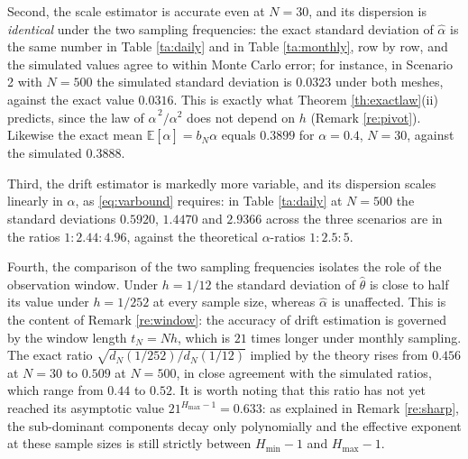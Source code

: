 \documentclass[11pt,reqno]{amsart}
\numberwithin{equation}{section}
\theoremstyle{plain}
\theoremstyle{definition}
\theoremstyle{remark}
\newcommand{\Hmax}{H_{\max}}
\newcommand{\Hmin}{H_{\min}}
\newcommand{\E}{\mathbb{E}}
\begin{document}
Second, the scale estimator is accurate even at $N=30$, and its dispersion is
\emph{identical} under the two sampling frequencies: the exact standard deviation of
$\widehat\alpha$ is the same number in Table \ref{ta:daily} and in
Table \ref{ta:monthly}, row by row, and the simulated values agree to within Monte Carlo
error; for instance, in Scenario 2 with $N=500$ the simulated standard deviation is
$0.0323$ under both meshes, against the exact value $0.0316$. This is exactly what
Theorem \ref{th:exactlaw}(ii) predicts, since the law of
$\widehat\alpha^{\,2}/\alpha^{2}$ does not depend on $h$ (Remark \ref{re:pivot}).
Likewise the exact mean $\E[\widehat\alpha]=b_N\alpha$ equals $0.3899$ for $\alpha=0.4$,
$N=30$, against the simulated $0.3888$.

Third, the drift estimator is markedly more variable, and its dispersion scales linearly
in $\alpha$, as \eqref{eq:varbound} requires: in Table \ref{ta:daily} at $N=500$ the
standard deviations $0.5920$, $1.4470$ and $2.9366$ across the three scenarios are in the
ratios $1:2.44:4.96$, against the theoretical $\alpha$-ratios $1:2.5:5$.

Fourth, the comparison of the two sampling frequencies isolates the role of the
observation window. Under $h=1/12$ the standard deviation of $\widehat\theta$ is close to
half its value under $h=1/252$ at every sample size, whereas $\widehat\alpha$ is
unaffected. This is the content of Remark \ref{re:window}: the accuracy of drift
estimation is governed by the window length $t_N=Nh$, which is $21$ times longer under
monthly sampling. The exact ratio $\sqrt{d_N(1/252)/d_N(1/12)}$ implied by the theory
rises from $0.456$ at $N=30$ to $0.509$ at $N=500$, in close agreement with the simulated
ratios, which range from $0.44$ to $0.52$. It is worth noting that this ratio has not yet
reached its asymptotic value $21^{\Hmax-1}=0.633$: as explained in Remark \ref{re:sharp},
the sub-dominant components decay only polynomially and the effective exponent at these
sample sizes is still strictly between $\Hmin-1$ and $\Hmax-1$.
\end{document}
